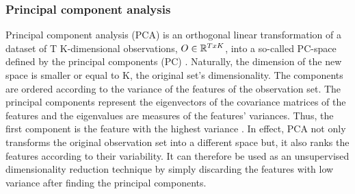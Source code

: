 \subsubsection{Principal component analysis}
 Principal component analysis (PCA) is an orthogonal linear transformation of a dataset of T K-dimensional observations, \(O \in \Bbb R^{TxK}\), into a so-called PC-space defined by the principal components (PC) \cite{dime2017}.
 Naturally, the dimension of the new space is smaller or equal to K, the original set's dimensionality. The components are ordered according to the variance of the features of the observation set. The principal components represent the eigenvectors of the covariance matrices of the features and the eigenvalues are measures of the features' variances. Thus, the first component is the feature with the highest variance \cite{dime2017}.
 In effect, PCA not only transforms the original observation set into a different space but, it also ranks the features according to their variability. It can therefore be used as an unsupervised dimensionality reduction technique by simply discarding the features with low variance after finding the principal components.